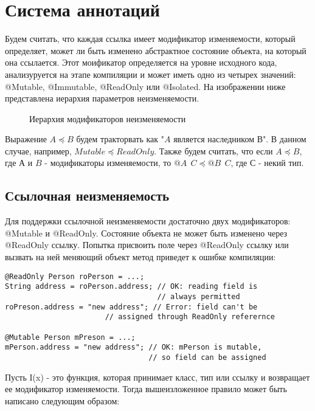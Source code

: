 \section{Система аннотаций}

Будем считать, что каждая ссылка имеет модификатор изменяемости, который определяет, может ли быть изменено абстрактное состояние объекта, на который она ссылается. Этот моификатор определяется на уровне исходного кода, анализуруется на этапе компиляции и может иметь одно из четырех значений: @Mutable, @Immutable, @ReadOnly или @Isolated. На изображении ниже представлена иерархия параметров неизменяемости. 

\begin{figure}[h]
\caption{Иерархия модификаторов неизменяемости}
\label{pic:my_classes}
\end{figure}

Выражение $A \preceq B$ будем тракторвать как "$A$ является наследником $В$". В данном случае, например, $Mutable \preceq ReadOnly$. Также будем считать, что если $A \preceq B$, где $А$ и $B$ - модификаторы изменяемости, то $@A\:\:C \preceq @B\:\:C$, где $С$ - некий тип.

\subsection{Ссылочная неизменяемость}

Для поддержки ссылочной неизменяемости достаточно двух модификаторов: @Mutable и @ReadOnly. Состояние объекта не может быть изменено через @ReadOnly ссылку. Попытка присвоить поле через @ReadOnly ссылку или вызвать на ней меняющий объект метод приведет к ошибке компиляции:

\begin{lstlisting}[caption=Mutable и RadOnly ссылки, label=code:mutable_vs_readonly]
@ReadOnly Person roPerson = ...;
String address = roPerson.address; // OK: reading field is 
                                   // always permitted
roPreson.address = "new address"; // Error: field can't be 
                       // assigned through ReadOnly referernce

@Mutable Person mPreson = ...;
mPerson.address = "new address"; // OK: mPerson is mutable, 
                                 // so field can be assigned
\end{lstlisting} 

Пусть I(x) - это функция, которая принимает класс, тип или ссылку и возвращает ее модификатор изменяемости. Тогда вышеизложенное правило может быть написано следующим образом:

